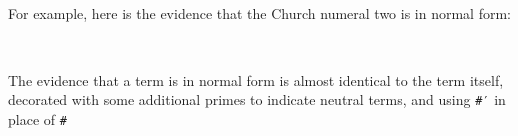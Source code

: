 \begin{fence}
\begin{code}%
\>[0]\AgdaSpace{}%
\AgdaSymbol{:}\AgdaSpace{}%
\AgdaSpace{}%
\AgdaSymbol{\{}\AgdaSymbol{\}}\AgdaSpace{}%
\AgdaSymbol{(}\AgdaSpace{}%
\AgdaSymbol{:}\AgdaSpace{}%
\AgdaSymbol{)}\AgdaSpace{}%
\AgdaSpace{}%
\AgdaSpace{}%
\AgdaSymbol{\{}\AgdaSymbol{\}}\AgdaSpace{}%
\AgdaSymbol{(}\AgdaOperator{\AgdaFunction{\#}}\AgdaSpace{}%
\AgdaSymbol{)}\<%
\\
\>[0]\AgdaSpace{}%
%
\>[6]\AgdaSymbol{=}%
\>[9]\AgdaSpace{}%
\AgdaSpace{}%
\<%
\end{code}
\end{fence}

For example, here is the evidence that the Church numeral two is in
normal form:

\begin{fence}
\begin{code}%
\>[0]\AgdaFunction{\AgdaUnderscore{}}\AgdaSpace{}%
\AgdaSymbol{:}\AgdaSpace{}%
\AgdaSpace{}%
\AgdaSymbol{(}\AgdaSpace{}%
\AgdaSymbol{\{}\AgdaSymbol{\})}\<%
\\
\>[0]\AgdaSymbol{\AgdaUnderscore{}}\AgdaSpace{}%
\AgdaSymbol{=}\AgdaSpace{}%
\AgdaSpace{}%
\AgdaSpace{}%
\AgdaSymbol{(}\AgdaSpace{}%
\AgdaSpace{}%
\AgdaSpace{}%
\AgdaSpace{}%
\AgdaSymbol{(}\AgdaSpace{}%
\AgdaSpace{}%
\AgdaSpace{}%
\AgdaSpace{}%
\AgdaSymbol{(}\AgdaSpace{}%
\AgdaSpace{}%
\AgdaSymbol{)))}\<%
\end{code}
\end{fence}

The evidence that a term is in normal form is almost identical to the
term itself, decorated with some additional primes to indicate neutral
terms, and using \texttt{\#′} in place of \texttt{\#}

